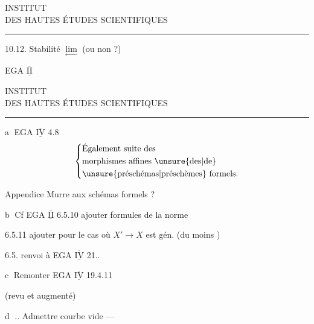 \begin{center}
INSTITUT\\
DES HAUTES ÉTUDES SCIENTIFIQUES\\[-.3ex]
\rule{1.3cm}{.4pt}
\end{center}

10.12. Stabilité  $\underset{\longleftarrow}{\lim}$ (ou non ?)

\begin{flushright}
EGA $\overline{\underline{\mathrm{II}}}$
\end{flushright}

\begin{center}
INSTITUT\\
DES HAUTES ÉTUDES SCIENTIFIQUES\\[-.3ex]
\rule{1.3cm}{.4pt}
\end{center}

\textcircled{a} \quad {} EGA $\underline{\overline{\mathrm{IV}}}$ 4.8
\[
\left\{\begin{aligned}
&\text{Également suite des}\\
&\text{morphismes affines \unsure{des|de}}\\
&\text{\unsure{préschémas|préschèmes} formels.}
\end{aligned}\right.
\]

{\reversemarginpar\margin{!}}Appendice  Murre aux schémas formels ?

\textcircled{b} \quad Cf EGA $\underline{\overline{\mathrm{II}}}$ 6.5.10 ajouter formules de la norme

6.5.11 ajouter  pour le cas où $X'\to X$ est gén.  (du moins )

6.5. renvoi à EGA $\underline{\overline{\mathrm{IV}}}$ 21..

\textcircled{c} \quad Remonter EGA $\underline{\overline{\mathrm{IV}}}$ 19.4.11

(revu et augmenté)

\textcircled{d} .. Admettre courbe vide ---
